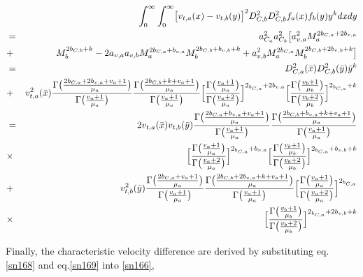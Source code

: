 \begin{eqnarray}
& &\int_{0}^{\infty}\int_{0}^{\infty}\bigl[v_{t,a}(x)-v_{t,b}(y)\bigr]^{2}D_{C,b}^{2}D_{C,b}^{2}f_{a}(x)f_{b}(y)y^{k}dxdy\nonumber\\
&=&a_{C_{a}}^{2}a_{C_{b}}^{2}\bigl[a_{v,a}^{2}M_{a}^{2b_{C,a}+2b_{v,a}}\nonumber\\
&+&M_{b}^{2b_{C,b}+k}-2a_{v,a}a_{v,b}M_{a}^{2b_{C,a}+b_{v,a}}M_{b}^{2b_{C,b}+b_{v,b}+k}+a_{v,b}^{2}M_{a}^{2b_{C,a}}M_{b}^{2b_{C,b}+2b_{v,b}+k}\bigr]\nonumber\\
&=&D_{C,a}^{2}(\bar{x})D_{C,b}^{2}(\bar{y})\bar{y}^{k}\nonumber\\
&+&v_{t,a}^{2}(\bar{x})
\frac{\Gamma\bigl(\frac{2b_{C,a}+2b_{v,a}+v_{a}+1}{\mu_{a}}\bigr)}{\Gamma\bigl(\frac{v_{a}+1}{\mu_{a}}\bigr)}
\frac{\Gamma\bigl(\frac{2b_{C,b}+k+v_{a}+1}{\mu_{a}}\bigr)}{\Gamma\bigl(\frac{v_{a}+1}{\mu_{a}}\bigr)}
\Bigl[\frac{\Gamma\bigl(\frac{v_{a}+1}{\mu_{a}}\bigr)}{\Gamma\bigl(\frac{v_{a}+2}{\mu_{a}}\bigr)}\Bigr]^{2_{b_{C,a}}+2b_{v,a}}
\Bigl[\frac{\Gamma\bigl(\frac{v_{b}+1}{\mu_{b}}\bigr)}{\Gamma\bigl(\frac{v_{b}+2}{\mu_{b}}\bigr)}\Bigr]^{2_{b_{C,a}}+k}\nonumber\\
&=&2v_{t,a}(\bar{x})v_{t,b}(\bar{y})
\frac{\Gamma\bigl(\frac{2b_{C,a}+b_{v,a}+v_{a}+1}{\mu_{a}}\bigr)}{\Gamma\bigl(\frac{v_{a}+1}{\mu_{a}}\bigr)}
\frac{\Gamma\bigl(\frac{2b_{C,b}+b_{v,a}+k+v_{a}+1}{\mu_{a}}\bigr)}{\Gamma\bigl(\frac{v_{a}+1}{\mu_{a}}\bigr)}\nonumber\\
&\times&\Bigl[\frac{\Gamma\bigl(\frac{v_{a}+1}{\mu_{a}}\bigr)}{\Gamma\bigl(\frac{v_{a}+2}{\mu_{a}}\bigr)}\Bigr]^{2_{b_{C,a}}+b_{v,a}}
\Bigl[\frac{\Gamma\bigl(\frac{v_{b}+1}{\mu_{b}}\bigr)}{\Gamma\bigl(\frac{v_{b}+2}{\mu_{b}}\bigr)}\Bigr]^{2_{b_{C,a}}+b_{v,b}+k}\nonumber\\
&+&v_{t,b}^{2}(\bar{y})
\frac{\Gamma\bigl(\frac{2b_{C,a}+v_{a}+1}{\mu_{a}}\bigr)}{\Gamma\bigl(\frac{v_{a}+1}{\mu_{a}}\bigr)}
\frac{\Gamma\bigl(\frac{2b_{C,b}+2b_{v,a}+k+v_{a}+1}{\mu_{a}}\bigr)}{\Gamma\bigl(\frac{v_{a}+1}{\mu_{a}}\bigr)}
\Bigl[\frac{\Gamma\bigl(\frac{v_{a}+1}{\mu_{a}}\bigr)}{\Gamma\bigl(\frac{v_{a}+2}{\mu_{a}}\bigr)}\Bigr]^{2_{b_{C,a}}}\nonumber\\
&\times&\Bigl[\frac{\Gamma\bigl(\frac{v_{b}+1}{\mu_{b}}\bigr)}{\Gamma\bigl(\frac{v_{b}+2}{\mu_{b}}\bigr)}\Bigr]^{2_{b_{C,a}}+2b_{v,b}+k}\label{sn169}
\end{eqnarray}

Finally, the characteristic velocity difference are derived by substituting eq.\ref{sn168} and eq.\ref{sn169} into \ref{sn166},


